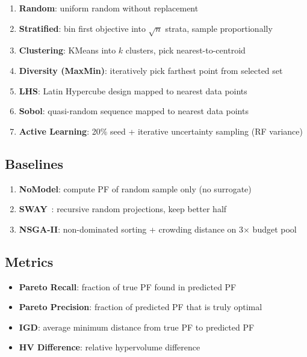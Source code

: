 \documentclass[conference]{IEEEtran}
\begin{document}
\begin{enumerate}
    \item \textbf{Random}: uniform random without replacement
    \item \textbf{Stratified}: bin first objective into $\sqrt{n}$ strata, sample proportionally
    \item \textbf{Clustering}: KMeans into $k$ clusters, pick nearest-to-centroid
    \item \textbf{Diversity (MaxMin)}: iteratively pick farthest point from selected set
    \item \textbf{LHS}: Latin Hypercube design mapped to nearest data points
    \item \textbf{Sobol}: quasi-random sequence mapped to nearest data points
    \item \textbf{Active Learning}: 20\% seed + iterative uncertainty sampling (RF variance)
\end{enumerate}

\subsection{Baselines}

\begin{enumerate}
    \item \textbf{NoModel}: compute PF of random sample only (no surrogate)
    \item \textbf{SWAY}~\cite{chen2019sampling}: recursive random projections, keep better half
    \item \textbf{NSGA-II}: non-dominated sorting + crowding distance on 3$\times$ budget pool
\end{enumerate}

\subsection{Metrics}

\begin{itemize}
    \item \textbf{Pareto Recall}: fraction of true PF found in predicted PF
    \item \textbf{Pareto Precision}: fraction of predicted PF that is truly optimal
    \item \textbf{IGD}: average minimum distance from true PF to predicted PF
    \item \textbf{HV Difference}: relative hypervolume difference
\end{itemize}
\end{document}
